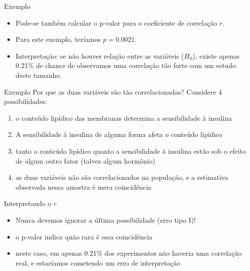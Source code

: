 \documentclass{beamer}
\begin{document}
\begin{frame}{Exemplo}
  \begin{itemize}
  \item Pode-se também calcular o p-valor para o coeficiente de
    correlação $r$.
  \item Para este exemplo, teríamos $p=0.0021$.
  \item Interpretação: se não houver relação entre as variáveis
    ($H_0$), existe apenas 0.21\% de chance de observamos uma
    correlação tão forte com um estudo deste tamanho
  \end{itemize}
\end{frame}

\begin{frame}{Exemplo}
  Por que as duas variáveis são tão correlacionadas? Considere 4
  possibilidades:
  \begin{enumerate}
  \item o conteúdo lipídico das membranas \alert<1>{determina} a
    sensibilidade à insulina
  \item A sensibilidade à insulina de alguma forma \alert<2>{afeta} o conteúdo lipídico
  \item tanto o conteúdo lipídico quanto a sensibilidade à insulina
    estão sob o efeito de \alert<3>{algum outro} fator (talvez algum hormônio)
  \item as duas variáveis não são correlacionados na população, e a
    estimativa observada nessa amostra é \alert<4>{mera coincidência}
  \end{enumerate}
\end{frame}

\begin{frame}{Interpretando o $r$}
  \begin{itemize}
  \item Nunca devemos ignorar a última possibilidade (erro tipo I)!
  \item o p-valor indica quão rara é essa coincidência
  \item neste caso, em apenas 0.21\% dos experimentos não haveria uma
    correlação real, e estaríamos cometendo um erro de interpretação
  \end{itemize}
\end{frame}

\end{document}
